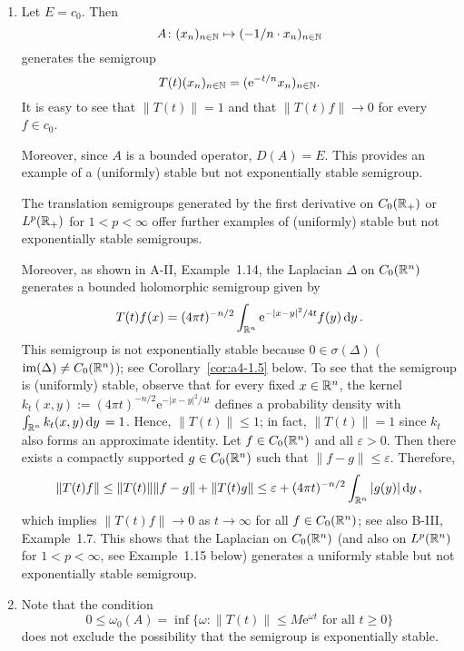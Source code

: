 \begin{example}\label{ex:a4-1.2}
\begin{enumerate}[\upshape (i), wide, labelindent=.5em]

\item 
Let $E = c_{0}$. 
Then 
\[
A \colon (x_{n})_{n \in \mathbb{N}} \mapsto (-1/n \cdot x_{n})_{n \in \mathbb{N}}
\] 
generates the semigroup 
\[
T(t)(x_{n})_{n \in \mathbb{N}} = (\mathrm{e}^{-t/n} x_{n})_{n \in \mathbb{N}}.
\]
It is easy to see that $\|T(t)\|=1$ and that $\|T(t)f\|\to 0$ for every $f \in c_{0}$.

Moreover, since $A$ is a bounded operator, $D(A) = E$.
This provides an example of a (uniformly) stable but not exponentially stable semigroup.

The translation semigroups generated by the first derivative on $C_0(\mathbb{R}_{+})$ or $L^{p}(\mathbb{R}_{+})$ for $1 < p < \infty$ offer further examples of (uniformly) stable but not exponentially stable semigroups.

Moreover, as shown in A-II, Example~1.14, the Laplacian $\Delta$ on $C_0(\mathbb{R}^{n})$ generates a bounded holomorphic semigroup given by
\[
T(t)f(x) = (4\pi t)^{-n/2} \int_{\mathbb{R}^{n}} \mathrm{e}^{-|x-y|^{2}/4t} f(y)  \mathop{}\!\mathrm{d}{y}\,.
\]
This semigroup is not exponentially stable because $0 \in \sigma(\Delta)$ ($\textrm{im}(\Delta) \not= C_0(\mathbb{R}^{n})$); see Corollary~\ref{cor:a4-1.5} below. To see that the semigroup is (uniformly) stable, observe that for every fixed $x\in\mathbb{R}^n$, the kernel $k_t(x,y) := (4\pi t)^{-n/2} \mathrm{e}^{-|x-y|^{2}/4t}$ defines a probability density with $\int_{\mathbb{R}^n} k_t(x,y) \mathop{}\!\mathrm{d}{y}\, = 1$. Hence, $\|T(t)\| \le 1$; in fact, $\|T(t)\| = 1$ since $k_t$ also forms an approximate identity. Let $f \in C_0(\mathbb{R}^{n})$ and all $\varepsilon > 0$. Then there exists a compactly supported $g \in C_0(\mathbb{R}^{n})$ such that $\|f-g\| \le \varepsilon$. Therefore,
\[
\|T(t)f\| \le  \|T(t)\|\|f-g\| + \|T(t)g\| \le \varepsilon + (4\pi t)^{-n/2} \int_{\mathbb{R}^{n}} |g(y)|  \mathop{}\!\mathrm{d}{y}\, ,
\]
which implies  $\|T(t)f\| \to 0$ as $t\to\infty$ for all $f \in C_0(\mathbb{R}^{n})$; see also B-III, Example~1.7.
This shows that the Laplacian on $C_0(\mathbb{R}^{n})$ (and also on $L^{p}(\mathbb{R}^{n})$ for $1 < p < \infty$, see Example~1.15 below) generates a uniformly stable but not exponentially stable semigroup.

\item 
Note that the condition 
\[
0 \leq \omega_{0}(A) = \inf\{\omega\colon\|T(t)\| \leq M\mathrm{e}^{\omega t} \text{ for all } t \geq 0\}
\]
does not exclude the possibility that the semigroup is exponentially stable.


\end{enumerate}
\end{example}
